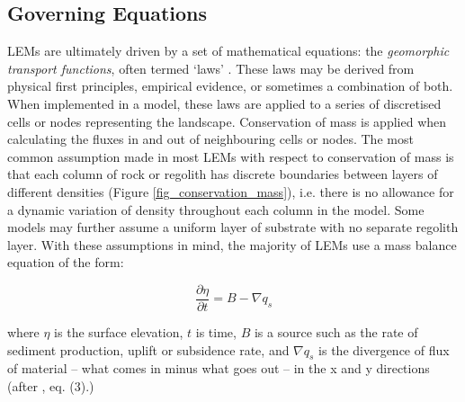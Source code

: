 \subsection{Governing Equations}

LEMs are ultimately driven by a set of mathematical equations: the \textit{geomorphic transport functions}, often termed `laws' \citep{dietrich2003geomorphic,Tucker2010}. These laws may be derived from physical first principles, empirical evidence, or sometimes a combination of both. When implemented in a model, these laws are applied to a series of discretised cells or nodes representing the landscape. Conservation of mass is applied when calculating the fluxes in and out of neighbouring cells or nodes. The most common assumption made in most LEMs with respect to conservation of mass is that each column of rock or regolith has discrete boundaries between layers of different densities (Figure \ref{fig_conservation_mass}), i.e. there is no allowance for a dynamic variation of density throughout each column in the model. Some models may further assume a uniform layer of substrate with no separate regolith layer. With these assumptions in mind, the majority of LEMs use a mass balance equation of the form:

\begin{equation*}
\frac{{\partial}\eta }{{\partial}t}=B-{\nabla}q_s
\end{equation*}

\noindent
where $\eta $ is the surface elevation, \(t\) is time, \(B\) is a source such as the rate of sediment production, uplift or subsidence rate, and  ${\nabla}q_s$ is the divergence of flux of material – what comes in minus what goes out -- in the x and y directions (after \citet{Tucker2010}, eq. (3).)

